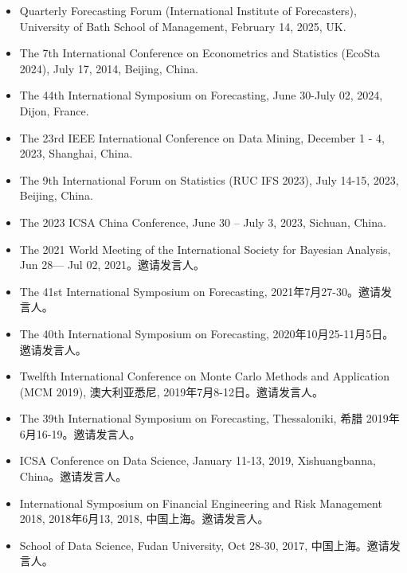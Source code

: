 \documentclass[twoside,a4paper,11pt]{article}
\begin{document}
\begin{itemize}

\item Quarterly Forecasting Forum (International Institute of Forecasters), University of Bath School of Management, February 14, 2025, UK.

\item The 7th International Conference on Econometrics and Statistics (EcoSta 2024), July 17, 2014, Beijing, China.

\item The 44th International Symposium on Forecasting, June 30-July 02, 2024, Dijon, France.

\item The 23rd IEEE International Conference on Data Mining, December 1 - 4, 2023, Shanghai, China.

\item The 9th International Forum on Statistics (RUC IFS 2023), July 14-15, 2023, Beijing, China.

\item The 2023 ICSA China Conference, June 30 – July 3, 2023, Sichuan, China.

\item The 2021 World Meeting of the International Society for Bayesian Analysis, Jun
  28— Jul 02, 2021。邀请发言人。

\item The 41st International Symposium on Forecasting, 2021年7月27-30。邀请发言人。

\item The 40th International Symposium on Forecasting,  2020年10月25-11月5日。邀请发言人。

\item Twelfth International Conference on Monte Carlo Methods and Application (MCM 2019),
  澳大利亚悉尼, 2019年7月8-12日。邀请发言人。

\item The 39th International Symposium on Forecasting, Thessaloniki, 希腊 2019年6月16-19。邀请发言人。

\item ICSA Conference on Data Science, January 11-13, 2019, Xishuangbanna, China。邀请发言人。

\item International Symposium on Financial Engineering and Risk Management 2018, 2018年6月13,
  2018, 中国上海。邀请发言人。

\item School of Data Science, Fudan University, Oct 28-30, 2017, 中国上海。邀请发言人。


\end{itemize}
\end{document}
